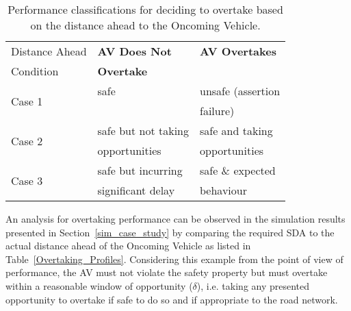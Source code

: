 \begin{table}[]
\centering
\begin{tabular}{|p{2.3cm}|p{2.3cm}|p{2.3cm}|}
\hline
\multicolumn{1}{|l|}{Distance Ahead} & \multicolumn{1}{l|}{\textbf{AV Does Not }} & \multicolumn{1}{l|}{\textbf{AV Overtakes}} \\ 
Condition & \textbf{Overtake} & \\
\hline
\multirow{2}{*}{Case 1} & safe & unsafe (assertion \\
& & failure) \\
\hline
\multirow{2}{*}{Case 2} & safe but not taking & safe and taking\\ 
& opportunities & opportunities\\
\hline
\multirow{2}{*}{Case 3} & safe but incurring  & safe \& expected  \\ 
& significant delay & behaviour\\
\hline
\end{tabular}
\caption{Performance classifications for deciding to overtake based on the distance ahead to the Oncoming Vehicle.}
\label{performance_metric_table}
\end{table}

An analysis for overtaking performance can be observed in the simulation results presented in Section~\ref{sim_case_study} by comparing the required SDA to the actual distance ahead of the Oncoming Vehicle as listed in Table~\ref{Overtaking_Profiles}. 
Considering this example from the point of view of performance, the AV must not violate the safety property but must overtake within a reasonable window of opportunity ($\delta$), i.e. taking any presented opportunity to overtake if safe to do so and if appropriate to the road network. 
%

